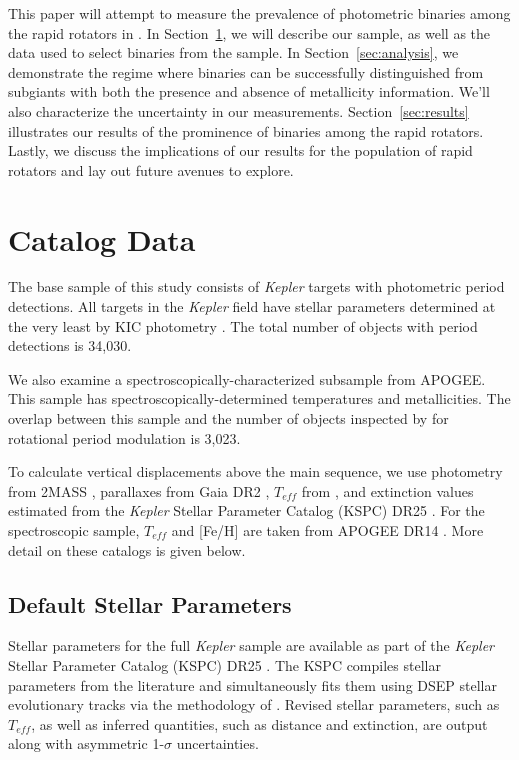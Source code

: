 \documentclass[manuscript]{aastex6}
\newcommand{\Kepler}{\mbox{\textit{Kepler}}}
\newcommand{\Teff}{\ensuremath{T_{eff}}}
\newcommand{\gvs}{\authorcomment1}
\begin{document}
This paper will attempt to measure the prevalence of photometric binaries among
the rapid rotators in \citet{McQuillan14}. In Section~\ref{sec:data}, we will 
describe our sample, as well as the data used to select binaries from the 
sample. In Section~\ref{sec:analysis}, we demonstrate the regime where 
binaries can be successfully distinguished from subgiants with both the 
presence and absence of metallicity information. We'll also characterize the 
uncertainty in our measurements. Section~\ref{sec:results} illustrates our 
results of the prominence of binaries among the rapid rotators. Lastly, we 
discuss the implications of our results for the population of rapid rotators 
and lay out future avenues to explore.

\section{Catalog Data}
\label{sec:data}

The base sample of this study consists of \Kepler{} targets with photometric
period detections. All targets in the \Kepler{} field have stellar parameters
determined at the very least by KIC photometry \citep{Brown11}. The total
number of objects with period detections is 34,030.

\gvs{Should isochrones be described in Catalog Data?}

We also examine a spectroscopically-characterized subsample from APOGEE\@. 
This sample has spectroscopically-determined temperatures and metallicities. 
The overlap between this sample and the number of objects inspected by 
\citet{McQuillan14} for rotational period modulation is 3,023.

To calculate vertical displacements above the main sequence, we use photometry
from 2MASS \citep{Skrutskie06}, parallaxes from Gaia DR2 \citep{Gaia18},
\Teff{} from \citet{Pinsonneault12}, and extinction values estimated from the 
\Kepler{} Stellar Parameter Catalog (KSPC) DR25 \citep{Huber14,Mathur17}. 
For the spectroscopic sample, \Teff{} and [Fe/H] are taken from APOGEE DR14 
\citep{Abolfathi18}. More detail on these catalogs is given below.

\subsection{Default Stellar Parameters}

Stellar parameters for the full \Kepler{} sample are available as part of the
\Kepler{} Stellar Parameter Catalog (KSPC) DR25 \citep{Mathur17}. The KSPC
compiles stellar parameters from the literature and simultaneously fits them
using DSEP \citep{Dotter08} stellar evolutionary tracks via the methodology of
\citet{Huber14}. Revised stellar parameters, such as \Teff, as well as inferred
quantities, such as distance and extinction, are output along with asymmetric
1-\(\sigma\) uncertainties. 
\end{document}
